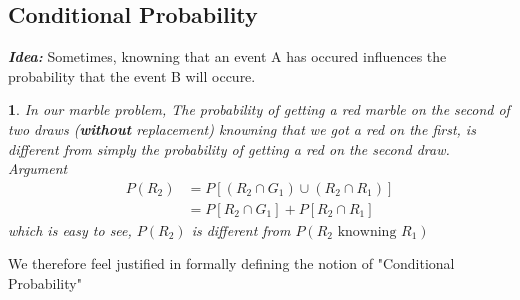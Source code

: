 \documentclass[11pt]{article}
\newtheorem{example}{\framebox{Ex}}[section]
\begin{document}
        \subsection{Conditional Probability}
                \textbf{\textit{Idea: }} Sometimes, knowning that an event A has occured influences the probability
                                            that the event B will occure. 
                \begin{example}
                    In our marble problem, The probability of getting a red marble on the second of two draws (\textbf{without} replacement)
                    knowning that we got a red on the first, is different from simply the probability of getting a red on the second draw.
                    Argument 
                    \begin{align*}
                        P(R_2) &= P[ (R_2 \cap G_1) \cup (R_2 \cap R_1)]\\
                                &=P[R_2 \cap G_1] + P[R_2 \cap R_1]
                    \end{align*}
                    which is easy to see, $P(R_2)$ is different from $P(R_2 \text{ knowning } R_1)$
                \end{example}
                We therefore feel justified in formally defining the notion of "Conditional Probability"
\end{document}
